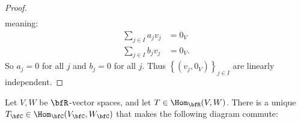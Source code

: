 \begin{proof}
\begin{equation*}
\begin{split}
                \end{split}
                \end{equation*}
            meaning:
                \begin{equation*}
                \begin{split}
                    \sum_{j \in I}a_jv_j &= 0_V \\
                    \sum_{j \in I}b_jv_j &= 0_V.
                \end{split}
                \end{equation*}
            So $a_j = 0$ for all $j$ and $b_j = 0$ for all $j$. Thus $\left\{(v_j,0_V)\right\}_{j \in I}$ are linearly independent.
        \end{proof}

    \begin{proposition}
        Let $V,W$ be $\bfR$-vector spaces, and let $T \in \Hom_\bfR(V,W)$. There is a unique $T_\bfC \in \Hom_\bfC(V_\bfC,W_\bfC)$ that makes the following diagram commute:
            \begin{center}
            \end{center}
    \end{proposition}
